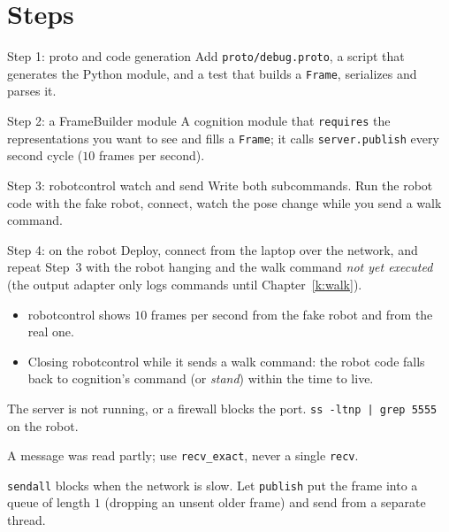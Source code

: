 \section*{Steps}
\begin{stepbox}{Step 1: proto and code generation}
Add \texttt{proto/debug.proto}, a script that generates the Python module, and a test that builds a \texttt{Frame}, serializes and parses it.
\end{stepbox}
\begin{stepbox}{Step 2: a FrameBuilder module}
A cognition module that \texttt{requires} the representations you want to see and fills a \texttt{Frame}; it calls \verb!server.publish! every second cycle ($10$ frames per second).
\end{stepbox}
\begin{stepbox}{Step 3: robotcontrol watch and send}
Write both subcommands. Run the robot code with the fake robot, connect, watch the pose change while you send a walk command.
\end{stepbox}
\begin{stepbox}{Step 4: on the robot}
Deploy, connect from the laptop over the network, and repeat Step~3 with the robot hanging and the walk command \emph{not yet executed} (the output adapter only logs commands until Chapter~\ref{k:walk}).
\end{stepbox}

\begin{checkbox}
\begin{itemize}[nosep]
  \item robotcontrol shows $10$ frames per second from the fake robot and from the real one.
  \item Closing robotcontrol while it sends a walk command: the robot code falls back to cognition's command (or \emph{stand}) within the time to live.
\end{itemize}
\end{checkbox}

\begin{troublebox}
\begin{description}[leftmargin=0.6cm,nosep]
  \item[\texttt{Connection refused}] The server is not running, or a firewall blocks the port. \verb!ss -ltnp | grep 5555! on the robot.
  \item[Garbage values after a while] A message was read partly; use \verb!recv_exact!, never a single \verb!recv!.
  \item[Cognition becomes slow when the Wi-Fi is bad] \verb!sendall! blocks when the network is slow. Let \verb!publish! put the frame into a queue of length $1$ (dropping an unsent older frame) and send from a separate thread.
\end{description}
\end{troublebox}

